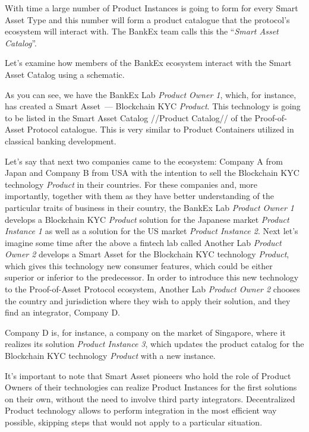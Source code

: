 \documentclass{article}
\begin{document}
\begin{multicols}{2}
With time a large number of Product Instances is going to form for every Smart Asset Type and this number will form a product catalogue that the protocol’s ecosystem will interact with. The BankEx team calls this the \enquote{\textit{Smart Asset Catalog}}.

Let’s examine how members of the BankEx ecosystem interact with the Smart Asset Catalog using a schematic. 

As you can see, we have the BankEx Lab \textit{Product Owner 1}, which, for instance, has created a Smart Asset~--- Blockchain KYC \textit{Product}. This technology is going to be listed in the Smart Asset Catalog //Product Catalog// of the Proof-of-Asset Protocol catalogue. This is very similar to Product Containers utilized in classical banking development.

Let’s say that next two companies came to the ecosystem: Company A from Japan and Company B from USA with the intention to sell the Blockchain KYC technology \textit{Product} in their countries. For these companies and, more importantly, together with them as they have better understanding of the particular traits of business in their country, the BankEx Lab \textit{Product Owner 1} develops a Blockchain KYC \textit{Product} solution for the Japanese market \textit{Product Instance 1} as well as a solution for the US market \textit{Product Instance 2}.
Next let’s imagine some time after the above a fintech lab called Another Lab \textit{Product Owner 2} develops a Smart Asset for the Blockchain KYC technology \textit{Product}, which gives this technology new consumer features, which could be either superior or inferior to the predecessor. In order to introduce this new technology to the Proof-of-Asset Protocol ecosystem, Another Lab \textit{Product Owner 2} chooses the country and jurisdiction where they wish to apply their solution, and they find an integrator, Company D.

Company D is, for instance, a company on the market of Singapore, where it realizes its solution \textit{Product Instance 3}, which updates the product catalog for the Blockchain KYC technology \textit{Product} with a new instance.

It’s important to note that Smart Asset pioneers who hold the role of Product Owners of their technologies can realize Product Instances for the first solutions on their own, without the need to involve third party integrators. Decentralized Product technology allows to perform integration in the most efficient way possible, skipping steps that would not apply to a particular situation.


\end{multicols}
\end{document}

